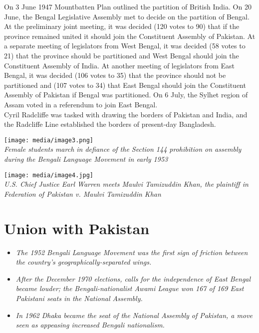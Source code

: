 On 3 June 1947 Mountbatten Plan outlined the partition of British India.
On 20 June, the Bengal Legislative Assembly met to decide on the
partition of Bengal. At the preliminary joint meeting, it was decided
(120 votes to 90) that if the province remained united it should join
the Constituent Assembly of Pakistan. At a separate meeting of
legislators from West Bengal, it was decided (58 votes to 21) that the
province should be partitioned and West Bengal should join the
Constituent Assembly of India. At another meeting of legislators from
East Bengal, it was decided (106 votes to 35) that the province should
not be partitioned and (107 votes to 34) that East Bengal should join
the Constituent Assembly of Pakistan if Bengal was partitioned. On 6
July, the Sylhet region of Assam voted in a referendum to join East
Bengal.\\
Cyril Radcliffe was tasked with drawing the borders of Pakistan and
India, and the Radcliffe Line established the borders of present-day
Bangladesh.

\texttt{[image: media/image3.png]}\\
\emph{Female students march in defiance of the Section 144 prohibition
on assembly during the Bengali Language Movement in early 1953}

\texttt{[image: media/image4.jpg]}\\
\emph{U.S. Chief Justice Earl Warren meets Maulvi Tamizuddin Khan, the
plaintiff in Federation of Pakistan v. Maulvi Tamizuddin Khan}

\section{Union with Pakistan}\label{union-with-pakistan}

\begin{itemize}
\item
  \emph{The 1952 Bengali Language Movement was the first sign of
  friction between the country's geographically-separated wings.}
\item
  \emph{After the December 1970 elections, calls for the independence of
  East Bengal became louder; the Bengali-nationalist Awami League won
  167 of 169 East Pakistani seats in the National Assembly.}
\item
  \emph{In 1962 Dhaka became the seat of the National Assembly of
  Pakistan, a move seen as appeasing increased Bengali nationalism.}
\end{itemize}

